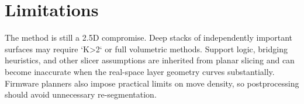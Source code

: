 \section{Limitations}

The method is still a 2.5D compromise. Deep stacks of independently important surfaces may require `K>2` or full volumetric methods. Support logic, bridging heuristics, and other slicer assumptions are inherited from planar slicing and can become inaccurate when the real-space layer geometry curves substantially. Firmware planners also impose practical limits on move density, so postprocessing should avoid unnecessary re-segmentation.
